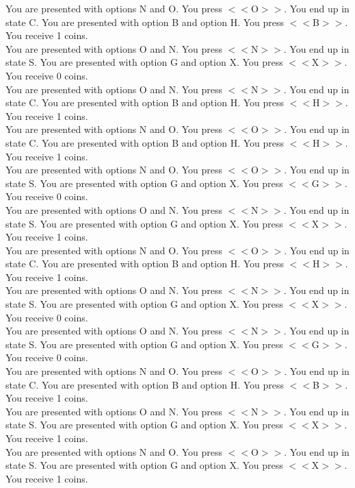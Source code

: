 \documentclass[pdflatex,sn-nature]{sn-jnl}%
\theoremstyle{thmstyleone}%
\theoremstyle{thmstyletwo}%
\theoremstyle{thmstylethree}%
\begin{document}
You are presented with options N and O. You press $<<$O$>>$. You end up in state C. You are presented with option B and option H. You press $<<$B$>>$. You receive 1 coins. $~$\\ 
You are presented with options O and N. You press $<<$N$>>$. You end up in state S. You are presented with option G and option X. You press $<<$X$>>$. You receive 0 coins. $~$\\ 
You are presented with options O and N. You press $<<$N$>>$. You end up in state C. You are presented with option B and option H. You press $<<$H$>>$. You receive 1 coins. $~$\\ 
You are presented with options N and O. You press $<<$O$>>$. You end up in state C. You are presented with option B and option H. You press $<<$H$>>$. You receive 1 coins. $~$\\ 
You are presented with options N and O. You press $<<$O$>>$. You end up in state S. You are presented with option G and option X. You press $<<$G$>>$. You receive 0 coins. $~$\\ 
You are presented with options O and N. You press $<<$N$>>$. You end up in state S. You are presented with option G and option X. You press $<<$X$>>$. You receive 1 coins. $~$\\ 
You are presented with options N and O. You press $<<$O$>>$. You end up in state C. You are presented with option B and option H. You press $<<$H$>>$. You receive 1 coins. $~$\\ 
You are presented with options O and N. You press $<<$N$>>$. You end up in state S. You are presented with option G and option X. You press $<<$X$>>$. You receive 0 coins. $~$\\ 
You are presented with options O and N. You press $<<$N$>>$. You end up in state S. You are presented with option G and option X. You press $<<$G$>>$. You receive 0 coins. $~$\\ 
You are presented with options N and O. You press $<<$O$>>$. You end up in state C. You are presented with option B and option H. You press $<<$B$>>$. You receive 1 coins. $~$\\ 
You are presented with options O and N. You press $<<$N$>>$. You end up in state S. You are presented with option G and option X. You press $<<$X$>>$. You receive 1 coins. $~$\\ 
You are presented with options N and O. You press $<<$O$>>$. You end up in state S. You are presented with option G and option X. You press $<<$X$>>$. You receive 1 coins. $~$\\ 
\end{document}
